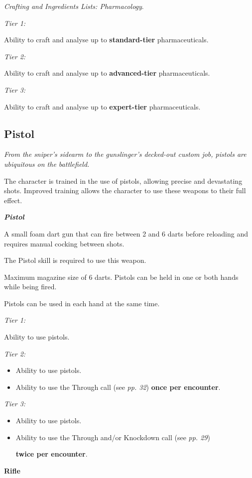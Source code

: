 \documentclass{scrbook}
\begin{document}
\textit{Crafting and Ingredients Lists: Pharmacology}.

\textit{Tier 1:}

Ability to craft and analyse up to \textbf{standard-tier} pharmaceuticals.

\textit{Tier 2:}

Ability to craft and analyse up to \textbf{advanced-tier} pharmaceuticals.

\textit{Tier 3:}

Ability to craft and analyse up to \textbf{expert-tier} pharmaceuticals.

\subsection{Pistol}

\textit{From the sniper's sidearm to the gunslinger's decked-out custom job, pistols are ubiquitous on the battlefield.}

The character is trained in the use of pistols, allowing precise and devastating shots. Improved training allows the character to use these weapons to their full effect.

\textbf{\textit{Pistol}}

A small foam dart gun that can fire between 2 and 6 darts before reloading and requires manual cocking between shots.

The Pistol skill is required to use this weapon.

Maximum magazine size of 6 darts. Pistols can be held in one or both hands while being fired.

Pistols can be used in each hand at the same time.

\textit{Tier 1:}

Ability to use pistols.

\textit{Tier 2:}

\begin{itemize}
\item Ability to use pistols.

\item Ability to use the Through call (see \textit{pp. 32}) \textbf{once per encounter}.

\end{itemize}
\textit{Tier 3:}

\begin{itemize}
\item Ability to use pistols.

\item Ability to use the Through and/or Knockdown call (see \textit{pp. 29})

\textbf{twice per encounter}.

\end{itemize}
\textbf{Rifle}
\end{document}
